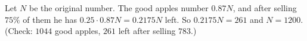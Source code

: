 Let $N$ be the original number. The good apples number $0.87N$, and after selling $75\%$ of them he has $0.25\cdot0.87N=0.2175N$ left. So $0.2175N=261$ and $N=\boxed{1200}$. (Check: $1044$ good apples, $261$ left after selling $783$.)
